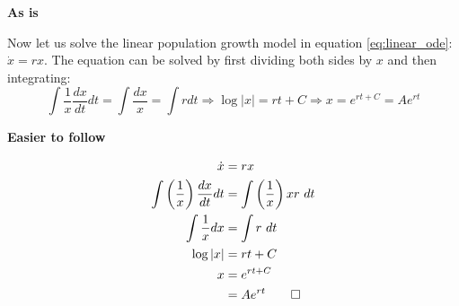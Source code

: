 \documentclass[11pt]{book}
\begin{document}
\textbf{As is}


  Now let us solve the linear population growth model in equation \ref{eq:linear_ode}: $\dot x = rx$. The equation can be solved by  first dividing  both sides by $x$ and then integrating:
  $$ \int \frac{1}{x} \frac{d x}{dt}  dt = \int \frac{dx}{x} = \int r dt \Longrightarrow \log |x| = rt + C  \Longrightarrow  x =  e^{rt+C} = Ae^{rt}$$


\textbf{Easier to follow}


\begin{align*}
  \dot x &= rx \\
  \int \left(\frac{1}{x}\right) \frac{dx}{dt} dt &= \int \left(\frac{1}{x}\right) xr\ dt  \\
  \int \frac{1}{x} dx &= \int r\ dt \\
  \log |x| &= rt + C \\
  x &= e^{rt + C} \\
  &= Ae^{rt} \qed
\end{align*}
\end{document}
